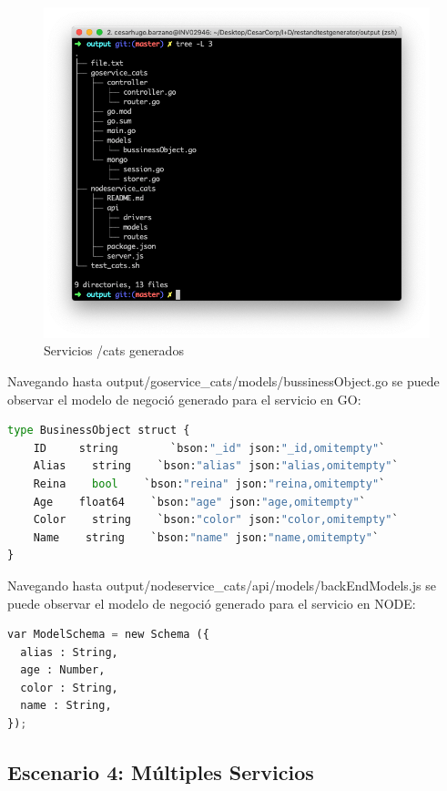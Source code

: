 \documentclass[a4paper,11pt]{book}
\begin{document}
\begin{figure}[H]  
\centering 
\includegraphics[scale=0.25]{imagenes/t31.png}
\caption{ Servicios /cats generados}  
\end{figure}

Navegando hasta output/goservice\_cats/models/bussinessObject.go se puede observar el modelo de negoció generado para el servicio en GO:

\begin{lstlisting}[language=python,caption={ Ejemplo Modelo de negocio GO  }]
type BusinessObject struct {
	ID     string     	 `bson:"_id" json:"_id,omitempty"`
	Alias    string    `bson:"alias" json:"alias,omitempty"`
	Reina    bool    `bson:"reina" json:"reina,omitempty"`
	Age    float64    `bson:"age" json:"age,omitempty"`
	Color    string    `bson:"color" json:"color,omitempty"`
	Name    string    `bson:"name" json:"name,omitempty"`
}
\end{lstlisting} 

Navegando hasta output/nodeservice\_cats/api/models/backEndModels.js se puede observar el modelo de negoció generado para el servicio en NODE:

\begin{lstlisting}[language=python,caption={  Ejemplo Modelo de negocio NODE }]
var ModelSchema = new Schema ({
  alias : String,
  age : Number,
  color : String,
  name : String,
});
\end{lstlisting} 

\subsection{Escenario 4: Múltiples Servicios}
\end{document}
